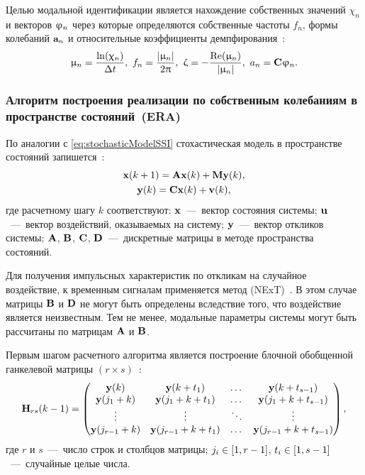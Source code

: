 Целью модальной идентификации является нахождение собственных значений $ \chi_n $ и векторов $ \mathbf{\upvarphi}_n $ через которые определяются собственные частоты $ f_n $, формы колебаний $ \mathbf{a}_n $ и относительные коэффициенты демпфирования~\cite{lib:oma:Nilsson}:
\begin{equation}
	\upmu_n = \frac{\ln(\upchi_n)}{\Delta t}, \ f_n = \frac{|\upmu_n|}{2 \uppi}, \ \upzeta = -\frac{\operatorname{Re}(\upmu_n)}{|\upmu_n|}, \ a_n = \mathbf{C} \mathbf{\upvarphi}_n.
\end{equation}

\subsubsection{Алгоритм построения реализации по собственным колебаниям в пространстве состояний~(ERA)}

По аналогии с \eqref{eq:stochasticModelSSI} стохастическая модель в пространстве состояний запишется~\cite{lib:oma:Juang&Pappa}:
\begin{equation}
	\begin{gathered}
		\mathbf{x}(k + 1) = \mathbf{A} \mathbf{x}(k) + \mathbf{M} \mathbf{y}(k), \\
		\mathbf{y}(k) = \mathbf{C} \mathbf{x}(k) + \mathbf{v}(k),
	\end{gathered}
\end{equation}
где расчетному шагу $ k $ соответствуют: $ \mathbf{x} $~---~вектор состояния системы; $ \mathbf{u} $~---~вектор воздействий, оказываемых на систему; $ \mathbf{y} $~---~вектор откликов системы; $ \mathbf{A} $, $ \mathbf{B} $, $ \mathbf{C} $, $ \mathbf{D} $~---~дискретные матрицы в методе пространства состояний.

Для получения импульсных характеристик по откликам на случайное воздействие, к временным сигналам применяется метод  (NExT)~\cite{lib:oma:Lin}. В этом случае матрицы $ \mathbf{B} $ и $ \mathbf{D} $ не могут быть определены вследствие того, что воздействие является неизвестным. Тем не менее, модальные параметры системы могут быть рассчитаны по матрицам $ \mathbf{A} $ и $ \mathbf{B} $. 

Первым шагом расчетного алгоритма является построение блочной обобщенной ганкелевой матрицы $ (r \times s) $~\cite{lib:oma:Caicedo}:
\begin{equation}
	\mathbf{H}_{rs}(k - 1) = 
	\begin{pmatrix}
		\mathbf{y}(k) & \mathbf{y}(k + t_1) & \dots & \mathbf{y}(k + t_{s - 1}) \\
		\mathbf{y}(j_1 + k) & \mathbf{y}(j_1 + k + t_1) & \dots & \mathbf{y}(j_1 + k + t_{s - 1}) \\
		\vdots & \vdots & \ddots & \vdots \\
		\mathbf{y}(j_{r - 1} + k) & \mathbf{y}(j_{r - 1} + k + t_1) & \dots & \mathbf{y}(j_{r - 1} + k + t_{s - 1})
	\end{pmatrix}, \label{eq:matrixHankel}
\end{equation}
где $ r $ и $ s $~---~число строк и столбцов матрицы; $ j_i \in \left[ 1, r - 1 \right] $, $ t_i \in \left[ 1, s - 1 \right] $~---~случайные целые числа.

